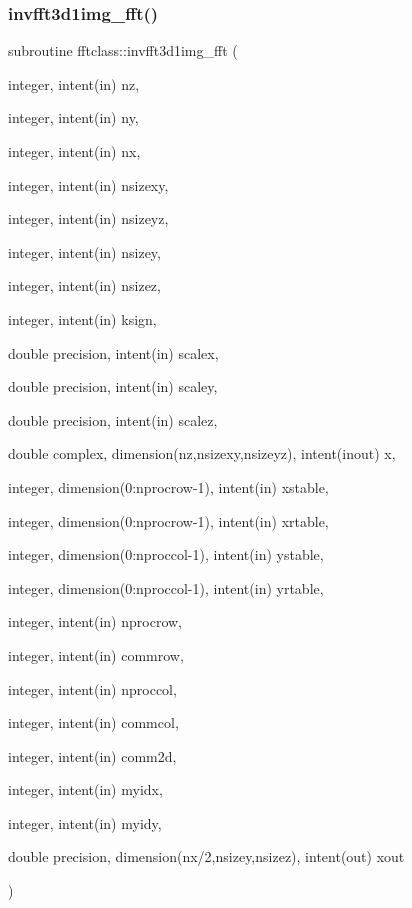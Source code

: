 \subsubsection{\texorpdfstring{invfft3d1img\_fft()}{invfft3d1img\_fft()}}
{\footnotesize\ttfamily subroutine fftclass\+::invfft3d1img\+\_\+fft (\begin{DoxyParamCaption}\item[{integer, intent(in)}]{nz,  }\item[{integer, intent(in)}]{ny,  }\item[{integer, intent(in)}]{nx,  }\item[{integer, intent(in)}]{nsizexy,  }\item[{integer, intent(in)}]{nsizeyz,  }\item[{integer, intent(in)}]{nsizey,  }\item[{integer, intent(in)}]{nsizez,  }\item[{integer, intent(in)}]{ksign,  }\item[{double precision, intent(in)}]{scalex,  }\item[{double precision, intent(in)}]{scaley,  }\item[{double precision, intent(in)}]{scalez,  }\item[{double complex, dimension(nz,nsizexy,nsizeyz), intent(inout)}]{x,  }\item[{integer, dimension(0\+:nprocrow-\/1), intent(in)}]{xstable,  }\item[{integer, dimension(0\+:nprocrow-\/1), intent(in)}]{xrtable,  }\item[{integer, dimension(0\+:nproccol-\/1), intent(in)}]{ystable,  }\item[{integer, dimension(0\+:nproccol-\/1), intent(in)}]{yrtable,  }\item[{integer, intent(in)}]{nprocrow,  }\item[{integer, intent(in)}]{commrow,  }\item[{integer, intent(in)}]{nproccol,  }\item[{integer, intent(in)}]{commcol,  }\item[{integer, intent(in)}]{comm2d,  }\item[{integer, intent(in)}]{myidx,  }\item[{integer, intent(in)}]{myidy,  }\item[{double precision, dimension(nx/2,nsizey,nsizez), intent(out)}]{xout }\end{DoxyParamCaption})}



